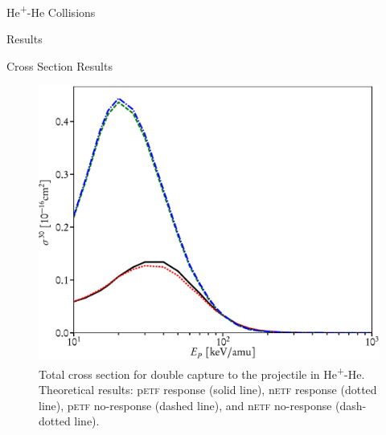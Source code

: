\documentclass[letterpaper, 11 pt]{report}
\begin{document}
\begin{chapter}{\texorpdfstring{He\textsuperscript{+}}{He+}-He Collisions \label{chap:hephe}}
\begin{section}{Results \label{sec:hephe-disc}}
\begin{subsection}{Cross Section Results \label{sec:hephe-res}}
\begin{figure}[t]
\begin{minipage}{.49\linewidth}
               \includegraphics[width = \linewidth]{./images/hephe-cross/HepHe-030.eps}
               \caption[Total cross section for double capture to the projectile in
                        He\textsuperscript{+}-He]
                       {Total cross section for double capture to the projectile in
                        He\textsuperscript{+}-He.
                        Theoretical results: p\textsc{etf} response (solid line), n\textsc{etf} response
                                             (dotted line), p\textsc{etf} no-response (dashed line), and
                                             n\textsc{etf} no-response (dash-dotted line).
                        \label{fig:cs030}}
            \end{minipage}
         \end{figure}


\end{subsection}
\end{section}
\end{chapter}
\end{document}
